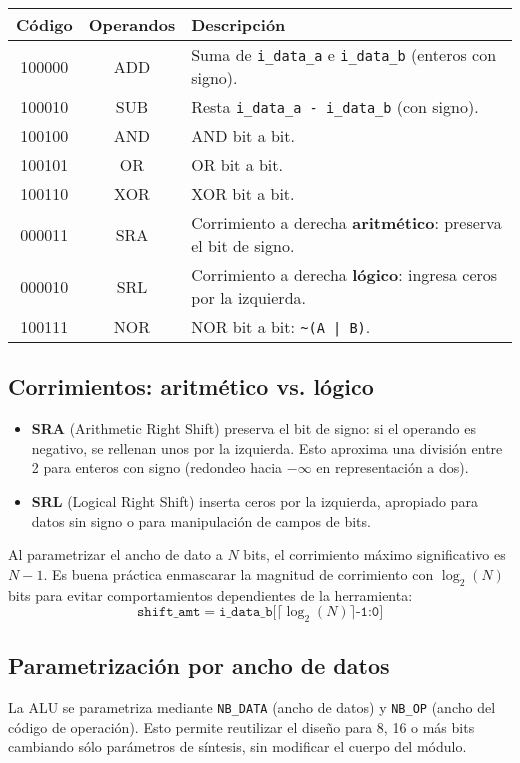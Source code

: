 \begin{center}
\begin{tabular}{|c|c|l|}
\hline
\textbf{Código} & \textbf{Operandos} & \textbf{Descripción} \\
\hline
100000 & ADD & Suma de \texttt{i\_data\_a} e \texttt{i\_data\_b} (enteros con signo). \\
100010 & SUB & Resta \texttt{i\_data\_a - i\_data\_b} (con signo). \\
100100 & AND & AND bit a bit. \\
100101 & OR  & OR bit a bit. \\
100110 & XOR & XOR bit a bit. \\
000011 & SRA & Corrimiento a derecha \textbf{aritmético}: preserva el bit de signo. \\
000010 & SRL & Corrimiento a derecha \textbf{lógico}: ingresa ceros por la izquierda. \\
100111 & NOR & NOR bit a bit: \texttt{\textasciitilde (A | B)}. \\
\hline
\end{tabular}
\end{center}

\subsection{Corrimientos: aritmético vs. lógico}
\begin{itemize}
    \item \textbf{SRA} (Arithmetic Right Shift) preserva el bit de signo: si el operando es negativo, se rellenan unos por la izquierda. Esto aproxima una división entre 2 para enteros con signo (redondeo hacia $-\infty$ en representación a dos).
    \item \textbf{SRL} (Logical Right Shift) inserta ceros por la izquierda, apropiado para datos sin signo o para manipulación de campos de bits.
\end{itemize}
Al parametrizar el ancho de dato a $N$ bits, el corrimiento máximo significativo es $N-1$. Es buena práctica enmascarar la magnitud de corrimiento con $\log_2(N)$ bits para evitar comportamientos dependientes de la herramienta:
\[
\texttt{shift\_amt} = \texttt{i\_data\_b[} \lceil\log_2(N)\rceil \texttt{-1:0]}
\]

\subsection{Parametrización por ancho de datos}
La ALU se parametriza mediante \texttt{NB\_DATA} (ancho de datos) y \texttt{NB\_OP} (ancho del código de operación). Esto permite reutilizar el diseño para 8, 16 o más bits cambiando sólo parámetros de síntesis, sin modificar el cuerpo del módulo.

